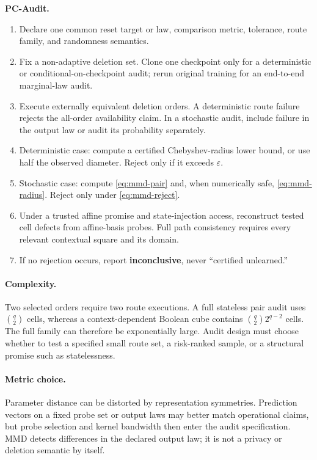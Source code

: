 \documentclass[10pt]{article}
\theoremstyle{definition}
\theoremstyle{remark}
\newcommand{\eps}{\varepsilon}
\begin{document}
\begin{center}
\begin{minipage}{0.94\textwidth}
\colorbox{AuditGray}{%
\parbox{0.96\textwidth}{\small
\textbf{PC-Audit.}
\begin{enumerate}[leftmargin=1.4em]
  \item Declare one common reset target or law, comparison metric, tolerance,
  route family, and randomness semantics.
  \item Fix a non-adaptive deletion set. Clone one checkpoint only for a
  deterministic or conditional-on-checkpoint audit; rerun original training
  for an end-to-end marginal-law audit.
  \item Execute externally equivalent deletion orders. A deterministic route
  failure rejects the all-order availability claim. In a stochastic audit,
  include failure in the output law or audit its probability separately.
  \item Deterministic case: compute a certified Chebyshev-radius lower bound,
  or use half the observed diameter. Reject only if it exceeds \(\eps\).
  \item Stochastic case: compute \eqref{eq:mmd-pair} and, when numerically safe,
  \eqref{eq:mmd-radius}. Reject only under \eqref{eq:mmd-reject}.
  \item Under a trusted affine promise and state-injection access, reconstruct
  tested cell defects from affine-basis probes. Full path consistency requires
  every relevant contextual square and its domain.
  \item If no rejection occurs, report \textbf{inconclusive}, never
  ``certified unlearned.''
\end{enumerate}}}
\end{minipage}
\end{center}

\paragraph{Complexity.}
Two selected orders require two route executions. A full stateless pair audit
uses \(\binom q2\) cells, whereas a context-dependent Boolean cube contains
\(\binom q2 2^{q-2}\) cells. The full family can therefore be exponentially
large. Audit design must choose whether to test a specified small route set,
a risk-ranked sample, or a structural promise such as statelessness.

\paragraph{Metric choice.}
Parameter distance can be distorted by representation symmetries. Prediction
vectors on a fixed probe set or output laws may better match operational
claims, but probe selection and kernel bandwidth then enter the audit
specification. MMD detects differences in the declared output law; it is not a
privacy or deletion semantic by itself.
\end{document}
